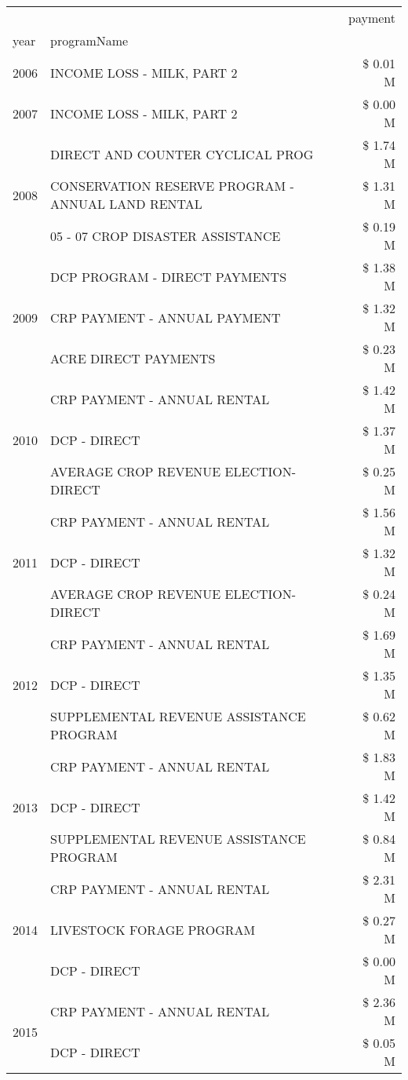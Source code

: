 \begin{tabular}{llr}
\toprule
 &  & payment \\
year & programName &  \\
\midrule
2006 & INCOME LOSS - MILK, PART 2 & \$ 0.01 M \\
\cline{1-3}
2007 & INCOME LOSS - MILK, PART 2 & \$ 0.00 M \\
\cline{1-3}
\multirow[t]{3}{*}{2008} & DIRECT AND COUNTER CYCLICAL PROG & \$ 1.74 M \\
 & CONSERVATION RESERVE PROGRAM - ANNUAL LAND RENTAL & \$ 1.31 M \\
 & 05 - 07 CROP DISASTER ASSISTANCE & \$ 0.19 M \\
\cline{1-3}
\multirow[t]{3}{*}{2009} & DCP PROGRAM - DIRECT PAYMENTS & \$ 1.38 M \\
 & CRP PAYMENT - ANNUAL PAYMENT & \$ 1.32 M \\
 & ACRE DIRECT PAYMENTS & \$ 0.23 M \\
\cline{1-3}
\multirow[t]{3}{*}{2010} & CRP PAYMENT - ANNUAL RENTAL & \$ 1.42 M \\
 & DCP - DIRECT & \$ 1.37 M \\
 & AVERAGE CROP REVENUE ELECTION-DIRECT & \$ 0.25 M \\
\cline{1-3}
\multirow[t]{3}{*}{2011} & CRP PAYMENT - ANNUAL RENTAL & \$ 1.56 M \\
 & DCP - DIRECT & \$ 1.32 M \\
 & AVERAGE CROP REVENUE ELECTION-DIRECT & \$ 0.24 M \\
\cline{1-3}
\multirow[t]{3}{*}{2012} & CRP PAYMENT - ANNUAL RENTAL & \$ 1.69 M \\
 & DCP - DIRECT & \$ 1.35 M \\
 & SUPPLEMENTAL REVENUE ASSISTANCE PROGRAM & \$ 0.62 M \\
\cline{1-3}
\multirow[t]{3}{*}{2013} & CRP PAYMENT - ANNUAL RENTAL & \$ 1.83 M \\
 & DCP - DIRECT & \$ 1.42 M \\
 & SUPPLEMENTAL REVENUE ASSISTANCE PROGRAM & \$ 0.84 M \\
\cline{1-3}
\multirow[t]{3}{*}{2014} & CRP PAYMENT - ANNUAL RENTAL & \$ 2.31 M \\
 & LIVESTOCK FORAGE PROGRAM & \$ 0.27 M \\
 & DCP - DIRECT & \$ 0.00 M \\
\cline{1-3}
\multirow[t]{3}{*}{2015} & CRP PAYMENT - ANNUAL RENTAL & \$ 2.36 M \\
 & DCP - DIRECT & \$ 0.05 M \\

\end{tabular}
